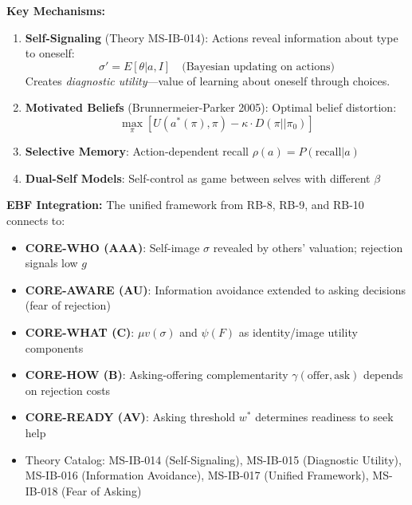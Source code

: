 \textbf{Key Mechanisms:}

\begin{enumerate}
    \item \textbf{Self-Signaling} (Theory MS-IB-014): Actions reveal information about type to oneself:
    \begin{equation}
    \sigma' = E[\theta|a, I] \quad \text{(Bayesian updating on actions)}
    \end{equation}
    Creates \textit{diagnostic utility}---value of learning about oneself through choices.

    \item \textbf{Motivated Beliefs} (Brunnermeier-Parker 2005): Optimal belief distortion:
    \begin{equation}
    \max_{\pi} \left[ U(a^*(\pi), \pi) - \kappa \cdot D(\pi||\pi_0) \right]
    \end{equation}

    \item \textbf{Selective Memory}: Action-dependent recall $\rho(a) = P(\text{recall}|a)$

    \item \textbf{Dual-Self Models}: Self-control as game between selves with different $\beta$
\end{enumerate}

\textbf{EBF Integration:} The unified framework from RB-8, RB-9, and RB-10 connects to:
\begin{itemize}
    \item \textbf{CORE-WHO (AAA)}: Self-image $\sigma$ revealed by others' valuation; rejection signals low $g$
    \item \textbf{CORE-AWARE (AU)}: Information avoidance extended to asking decisions (fear of rejection)
    \item \textbf{CORE-WHAT (C)}: $\mu v(\sigma)$ and $\psi(F)$ as identity/image utility components
    \item \textbf{CORE-HOW (B)}: Asking-offering complementarity $\gamma(\text{offer}, \text{ask})$ depends on rejection costs
    \item \textbf{CORE-READY (AV)}: Asking threshold $w^*$ determines readiness to seek help
    \item Theory Catalog: MS-IB-014 (Self-Signaling), MS-IB-015 (Diagnostic Utility), MS-IB-016 (Information Avoidance), MS-IB-017 (Unified Framework), MS-IB-018 (Fear of Asking)
\end{itemize}

